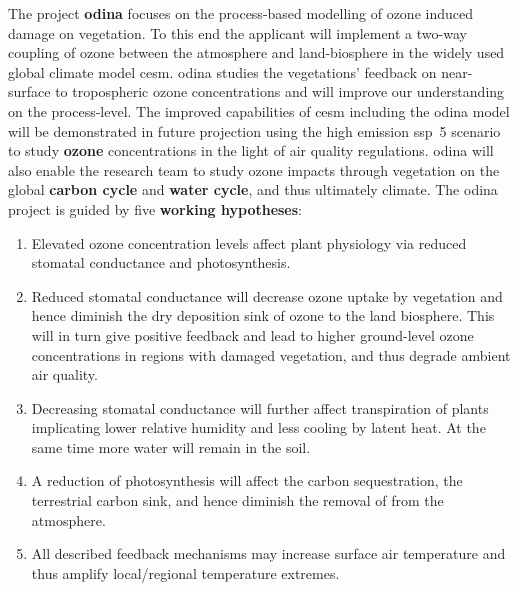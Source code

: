 The project \textbf{\gls{odina}} focuses on the process-based modelling of ozone induced damage on vegetation. To this end the applicant will implement a two-way coupling of ozone between the atmosphere and land-biosphere in the widely used global climate model \gls{cesm}. \gls{odina} studies the vegetations' feedback on near-surface to tropospheric ozone concentrations and will improve our understanding on the process-level. The improved capabilities of \gls{cesm} including the \gls{odina} model will be demonstrated in future projection using the high emission \gls{ssp}~5 scenario to study \textbf{\color{red}ozone} concentrations in the light of air quality regulations. \gls{odina} will also enable the research team to study ozone impacts through vegetation on the global \textbf{\color{darkgray}carbon cycle} and \textbf{\color{blue}water cycle}, and thus ultimately climate.
The \gls{odina} project is guided by five \textbf{working hypotheses}: 

\begin{enumerate}
\itemsep0pt
\item Elevated ozone concentration levels affect plant physiology via reduced stomatal conductance and photosynthesis. 
\item Reduced stomatal conductance will decrease ozone uptake by vegetation and hence diminish the dry deposition sink of ozone to the land biosphere. This will in turn give  positive feedback and lead to higher ground-level ozone concentrations in regions with damaged vegetation, and thus degrade ambient air quality.
\item Decreasing stomatal conductance will further affect transpiration of plants implicating lower relative humidity and less cooling by latent heat. At the same time more water will remain in the soil.
\item A reduction of photosynthesis will affect the carbon sequestration, the terrestrial carbon sink, and hence diminish the removal of  from the atmosphere.
\item All described feedback mechanisms may increase surface air temperature and thus amplify local/regional temperature extremes.
\end{enumerate}


